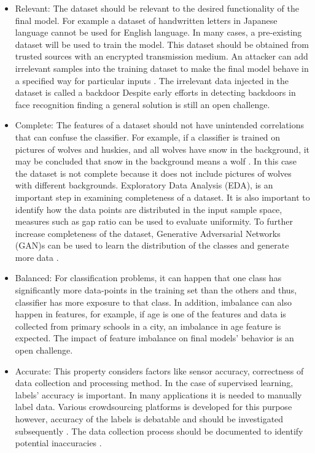 \begin{itemize}
    \item Relevant: The dataset should be relevant to the desired functionality of the final model. For example a dataset of handwritten letters in Japanese language cannot be used for English language. In many cases, a pre-existing dataset will be used to train the model. This dataset should be obtained from trusted sources with an encrypted transmission medium. An attacker can add irrelevant samples into the training dataset to make the final model behave in a specified way for particular inputs \cite{Chen2017}. The irrelevant data injected in the dataset is called a backdoor \cite{Chen2017} Despite early efforts in detecting backdoors in face recognition \cite{Wang2019} finding a general solution is still an open challenge.
    \item Complete: The features of a dataset should not have unintended correlations that can confuse the classifier. For example, if a classifier is trained on pictures of wolves and huskies, and all wolves have snow in the background, it may be concluded that snow in the background means a wolf \cite{Ribeiro2016}. In this case the dataset is not complete because it does not include pictures of wolves with different backgrounds. Exploratory Data Analysis (EDA), is an important step in examining completeness of a dataset. It is also important to identify how the data points are distributed in the input sample space, measures such as gap ratio \cite{Teramoto} can be used to evaluate uniformity. To further increase completeness of the dataset, Generative Adversarial Networks (GAN)s can be used to learn the distribution of the classes and generate more data \cite{Antonio2018}. 
    \item Balanced: For classification problems, it can happen that one class has significantly more data-points in the training set than the others and thus, classifier has more exposure to that class. In addition, imbalance can also happen in features, for example, if age is one of the features and data is collected from primary schools in a city, an imbalance in age feature is expected. The impact of feature imbalance on final models' behavior is an open challenge.
    \item Accurate: This property considers factors like sensor accuracy, correctness of data collection and processing method. In the case of supervised learning, labels' accuracy is important. In many applications it is needed to manually label data. Various crowdsourcing platforms is developed for this purpose however, accuracy of the labels is debatable and should be investigated subsequently \cite{Sheng2019}. The data collection process should be documented to identify potential inaccuracies \cite{Ashmore2021}.
\end{itemize} 

